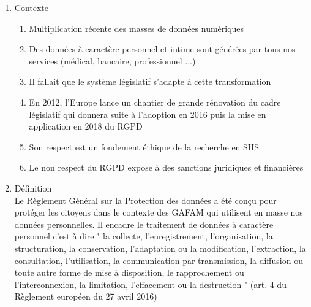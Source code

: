 \documentclass{book}
\begin{document}
\begin{enumerate}
    \item Contexte
    \begin{enumerate}
        \item Multiplication récente des masses de données numériques
        \item Des données à caractère personnel et intime sont générées par tous nos services (médical, bancaire, professionnel ...)
        \item Il fallait que le système législatif s'adapte à cette transformation
        \item En 2012, l'Europe lance un chantier de grande rénovation du cadre législatif qui donnera suite à l'adoption en 2016 puis la mise en application en 2018 du RGPD
        \item Son respect est un fondement éthique de la recherche en SHS
        \item Le non respect du RGPD expose à des sanctions juridiques et financières
    \end{enumerate}
	\item Définition \\
        Le Règlement Général sur la Protection des données a été conçu pour protéger les citoyens dans le contexte des GAFAM qui utilisent en masse nos données personnelles. Il encadre le traitement de données à caractère personnel c'est à dire " la collecte, l’enregistrement, l’organisation, la structuration, la conservation, l’adaptation ou la modification, l’extraction, la consultation, l’utilisation, la communication par transmission, la diffusion ou toute autre forme de mise à disposition, le rapprochement ou l’interconnexion, la limitation, l’effacement ou la destruction " (art. 4 du Règlement européen du 27 avril 2016) 
        

\end{enumerate}
\end{document}
